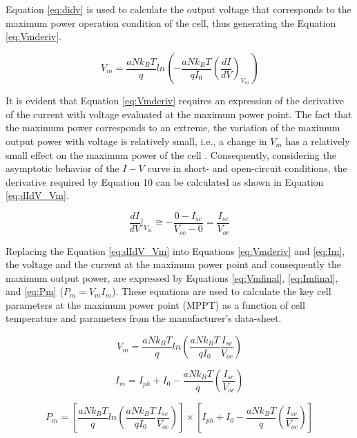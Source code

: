 Equation \ref{eq:didv} is used to calculate the output voltage that corresponds to the maximum power operation condition of the cell, thus generating the Equation \ref{eq:Vmderiv}.

\begin{equation}
\label{eq:Vmderiv}
V_{m}=\dfrac{aNk_{B}T}{q} ln \left( -\dfrac{aNk_{B}T}{qI_{0}} \left( \dfrac{dI}{dV}  \right)_{V_{m}}   \right) 
\end{equation}

It is evident that Equation \ref{eq:Vmderiv} requires an expression of the derivative of the current with voltage evaluated at the maximum power point. The fact that the maximum power corresponds to an extreme, the variation of the maximum output power with voltage is relatively small, i.e., a change in $ V_{m} $ has a relatively small effect on the maximum power of the cell \cite{Saloux}. Consequently, considering the asymptotic behavior of the $I-V$ curve in short- and open-circuit conditions, the derivative required by Equation 10 can be calculated as shown in Equation \ref{eq:dIdV_Vm}.

\begin{equation}
\label{eq:dIdV_Vm}
\dfrac{dI}{dV}\vert_{V_{m}} \cong -\dfrac{0-I_{sc}}{V_{oc}-0}=\dfrac{I_{sc}}{V_{oc}}
\end{equation}

Replacing the Equation \ref{eq:dIdV_Vm} into Equations \ref{eq:Vmderiv} and \ref{eq:Im}, the voltage and the current at the maximum power point and consequently the maximum output power, are expressed by Equations \ref{eq:Vmfinal}, \ref{eq:Imfinal}, and \ref{eq:Pm} ($ P_{m}=V_{m}I_{m} $). These equations are used to calculate the key cell parameters at the maximum power point (MPPT) as a function of cell temperature and parameters from the manufacturer's data-sheet.

\begin{equation}
\label{eq:Vmfinal}
V_{m}=\dfrac{aNk_{B}T}{q} ln \left( \dfrac{aNk_{B}T}{qI_{0}} \dfrac{I_{sc}}{V_{oc}}  \right) 
\end{equation}

\begin{equation}
\label{eq:Imfinal}
I_{m} = I_{ph} + I_{0} - \dfrac{aNk_{B}T}{q} \left( \dfrac{I_{sc}}{V_{oc}} \right)  
\end{equation}

\begin{equation}
\label{eq:Pm}
P_{m} = \left[ \dfrac{aNk_{B}T}{q} ln \left( \dfrac{aNk_{B}T}{qI_{0}} \dfrac{I_{sc}}{V_{oc}}  \right) \right] \times \left[ I_{ph} + I_{0} - \dfrac{aNk_{B}T}{q} \left( \dfrac{I_{sc}}{V_{oc}} \right)  \right] 
\end{equation}


